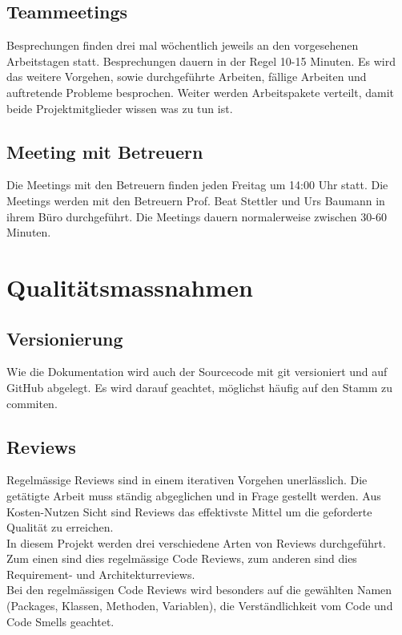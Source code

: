 \subsection{Teammeetings}
Besprechungen finden drei mal wöchentlich jeweils an den vorgesehenen Arbeitstagen statt. 
Besprechungen dauern in der Regel 10-15 Minuten. Es wird das weitere Vorgehen, sowie durchgeführte Arbeiten, fällige Arbeiten und auftretende Probleme besprochen. Weiter werden Arbeitspakete verteilt, damit beide Projektmitglieder wissen was zu tun ist. 

\subsection{Meeting mit Betreuern}
Die Meetings mit den Betreuern finden jeden Freitag um 14:00 Uhr statt. 
Die Meetings werden mit den Betreuern Prof. Beat Stettler und Urs Baumann in ihrem Büro durchgeführt. Die Meetings dauern normalerweise zwischen 30-60 Minuten. 

\section{Qualitätsmassnahmen}
\subsection{Versionierung}
Wie die Dokumentation wird auch der Sourcecode mit git versioniert und auf GitHub abgelegt. Es wird darauf geachtet, möglichst häufig auf den Stamm zu commiten.
\subsection{Reviews}
Regelmässige Reviews sind in einem iterativen Vorgehen unerlässlich. Die getätigte Arbeit muss ständig abgeglichen und in Frage gestellt werden. Aus Kosten-Nutzen Sicht sind Reviews das effektivste Mittel um die geforderte Qualität zu erreichen.\\ 

\noindent In diesem Projekt werden drei verschiedene Arten von Reviews durchgeführt. Zum einen sind dies regelmässige Code Reviews, zum anderen sind dies Requirement- und Architekturreviews.\\

\noindent Bei den regelmässigen Code Reviews wird besonders auf die gewählten Namen (Packages, Klassen, Methoden, Variablen), die Verständlichkeit vom Code und Code Smells geachtet.\\

